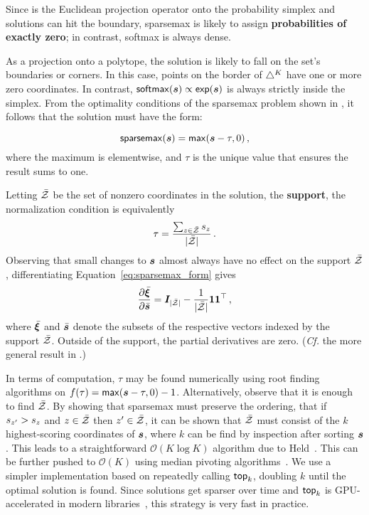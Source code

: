 Since
 is the Euclidean projection operator onto the probability
simplex and solutions can hit the boundary, sparsemax is likely to assign {\bf
        probabilities of exactly zero}; in contrast, softmax is always dense.

As a projection onto a polytope, the solution is likely to fall on the
set's boundaries or corners. In this case, points on the border of
$\simplex^K$ have one or more zero coordinates. In contrast, $\softmax(\s)
    \propto \exp(\s)$ is always strictly inside the simplex.
From the optimality conditions of the sparsemax problem shown in ,
it follows that the solution must have the form:

\begin{lemma}
    \begin{equation}\label{eq:sparsemax_form}
        \sparsemax(\s) = \max(\s - \tau, 0)\,,
    \end{equation}
    where the maximum is elementwise, and $\tau$ is the unique value that
    ensures the result sums to one.
\end{lemma}

Letting $\bar{\ZZ}$ be the set of nonzero coordinates in the solution, \ie the \textbf{support},
the normalization condition is equivalently
%
\begin{equation}
    \tau = \frac{\sum_{z \in \bar{\ZZ}} \ss_z}{|\bar{\ZZ}|}\,.
\end{equation}
%
Observing that small changes to $\s$ almost always have no effect on the support
$\bar{\ZZ}$, differentiating Equation~\ref{eq:sparsemax_form} gives
\begin{equation}
    \pfrac{\bar{\pv}}{\bar{\s}} = \bm{I}_{|\bar{\ZZ}|} - \frac{1}{|\bar{\ZZ}|}
    \bm{11}^\top\,,
\end{equation}
where $\bar{\pv}$ and ${\bar{\s}}$ denote the subsets of the respective vectors
indexed by the support $\bar{\ZZ}$. Outside of the support, the partial
derivatives are zero. (\emph{Cf.} the more general result in \citet[Proposition
    2]{entmax}.)

In terms of computation, $\tau$ may be found numerically using root finding
algorithms on $f(\tau) = \max(\s - \tau, 0) - 1$.
Alternatively, observe that it is enough to find $\bar{\ZZ}$. By showing that
sparsemax must preserve the ordering, \ie that if $\ss_{z'} > \ss_z$ and $z \in
    \bar{\ZZ}$ then $z' \in \bar{\ZZ}$, it can be shown that $\bar{\ZZ}$ must
consist of the $k$ highest-scoring coordinates of $\s$, where $k$ can be find by
inspection after sorting $\s$. This leads to a straightforward $\mathcal{O}(K
    \log K)$ algorithm due to Held~\citep[pp.~16--17]{Held1974}. This can be further pushed to
$\mathcal{O}(K)$ using median pivoting algorithms~\citep{Condat2016, entmax}. We use
a simpler implementation based on repeatedly calling $\topk$,
doubling $k$ until the optimal solution is found. Since solutions get sparser
over time and $\topk$ is GPU-accelerated
in modern libraries~\citep{pytorch}, this strategy is very fast in practice.

